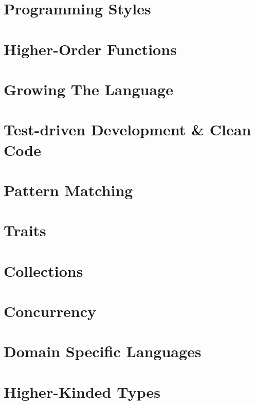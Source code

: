 \part[Programming Styles]{Programming Styles}
\part[Higher-Order Functions]{Higher-Order Functions}
\part[Growing The Language]{Growing The Language}
\part[TDD \& Clean Code]{Test-driven Development \& Clean Code}
\part[Pattern Matching]{Pattern Matching}
\part[Traits]{Traits}
\part[Collections]{Collections}
\part[Concurrency]{Concurrency}
\part[DSLs]{Domain Specific Languages}
\part[Higher-Kinded Types]{Higher-Kinded Types}
